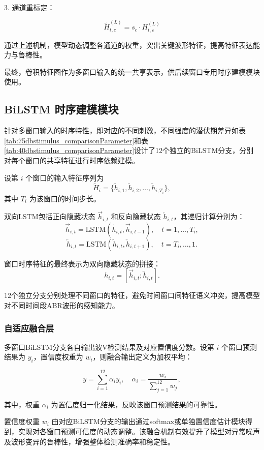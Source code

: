 3. 通道重标定：

\begin{equation}
\tilde{H}^{(L)}_{t,c} = s_c \cdot H^{(L)}_{t,c}
\end{equation}

通过上述机制，模型动态调整各通道的权重，突出关键波形特征，提高特征表达能力与鲁棒性。

最终，卷积特征图作为多窗口输入的统一共享表示，供后续窗口专用时序建模模块使用。


\subsection*{BiLSTM 时序建模模块}

针对多窗口输入的时序特性，即对应的不同刺激，不同强度的潜伏期差异如表\ref{tab:75dbstimulus_comparisonParameter}和表\ref{tab:40dbstimulus_comparisonParameter}设计了12个独立的BiLSTM分支，分别对每个窗口的共享特征进行时序依赖建模。

设第 \(i\) 个窗口的输入特征序列为
\[
\tilde{H}_i = \{ \tilde{h}_{i,1}, \tilde{h}_{i,2}, \ldots, \tilde{h}_{i,T_i} \},
\]
其中 \(T_i\) 为该窗口的时间步长。

双向LSTM包括正向隐藏状态 \(\overrightarrow{h}_{i,t}\) 和反向隐藏状态 \(\overleftarrow{h}_{i,t}\)，其递归计算分别为：
\[
\overrightarrow{h}_{i,t} = \mathrm{LSTM}(\tilde{h}_{i,t}, \overrightarrow{h}_{i,t-1}), \quad t=1,\ldots,T_i,
\]
\[
\overleftarrow{h}_{i,t} = \mathrm{LSTM}(\tilde{h}_{i,t}, \overleftarrow{h}_{i,t+1}), \quad t=T_i,\ldots,1.
\]

窗口时序特征的最终表示为双向隐藏状态的拼接：
\[
h_{i,t} = \left[ \overrightarrow{h}_{i,t} ; \overleftarrow{h}_{i,t} \right].
\]

12个独立分支分别处理不同窗口的特征，避免时间窗口间特征语义冲突，提高模型对不同时间段ABR波形的感知能力。

\subsubsection*{自适应融合层}

多窗口BiLSTM分支各自输出波V检测结果及对应置信度分数。设第 \(i\) 个窗口预测结果为 \(y_i\)，置信度权重为 \(w_i\)，则融合输出定义为加权平均：

\[
y = \sum_{i=1}^{12} \alpha_i y_i, \quad \alpha_i = \frac{w_i}{\sum_{j=1}^{12} w_j},
\]

其中，权重 \(\alpha_i\) 为置信度归一化结果，反映该窗口预测结果的可靠性。

置信度权重 \(w_i\) 由对应BiLSTM分支的输出通过softmax或单独置信度估计模块得到，实现对各窗口预测可信度的动态调整。该融合机制有效提升了模型对异常噪声及波形变异的鲁棒性，增强整体检测准确率和稳定性。

